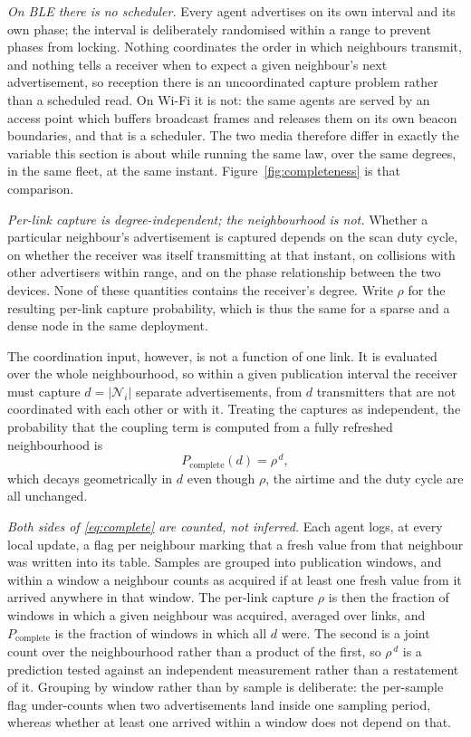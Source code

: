 \begin{enumerate}
\emph{On BLE there is no scheduler.} Every agent advertises on its own interval
and its own phase; the interval is deliberately randomised within a range to
prevent phases from locking. Nothing coordinates the order in which neighbours
transmit, and nothing tells a receiver when to expect a given neighbour's next
advertisement, so reception there is an uncoordinated capture problem rather
than a scheduled read. On Wi-Fi it is not: the same agents are served by an
access point which buffers broadcast frames and releases them on its own beacon
boundaries, and that is a scheduler. The two media therefore differ in exactly
the variable this section is about while running the same law, over the same
degrees, in the same fleet, at the same instant. Figure~\ref{fig:completeness}
is that comparison.

\emph{Per-link capture is degree-independent; the neighbourhood is not.} Whether
a particular neighbour's advertisement is captured depends on the scan duty
cycle, on whether the receiver was itself transmitting at that instant, on
collisions with other advertisers within range, and on the phase relationship
between the two devices. None of these quantities contains the receiver's degree.
Write $\rho$ for the resulting per-link capture probability, which is thus the
same for a sparse and a dense node in the same deployment.

The coordination input, however, is not a function of one link. It is evaluated
over the whole neighbourhood, so within a given publication interval the receiver
must capture $d = |\mathcal{N}_i|$ separate advertisements, from $d$ transmitters
that are not coordinated with each other or with it. Treating the captures as
independent, the probability that the coupling term is computed from a fully
refreshed neighbourhood is
\begin{equation}\label{eq:complete}
    P_\mathrm{complete}(d) = \rho^{\,d},
\end{equation}
which decays geometrically in $d$ even though $\rho$, the airtime and the duty
cycle are all unchanged.

\emph{Both sides of \eqref{eq:complete} are counted, not inferred.} Each agent
logs, at every local update, a flag per neighbour marking that a fresh value
from that neighbour was written into its table. Samples are grouped into
publication windows, and within a window a neighbour counts as acquired if at
least one fresh value from it arrived anywhere in that window. The per-link
capture $\rho$ is then the fraction of windows in which a given neighbour was
acquired, averaged over links, and $P_\mathrm{complete}$ is the fraction of
windows in which all $d$ were. The second is a joint count over the
neighbourhood rather than a product of the first, so $\rho^{\,d}$ is a
prediction tested against an independent measurement rather than a restatement
of it. Grouping by window rather than by sample is deliberate: the per-sample
flag under-counts when two advertisements land inside one sampling period,
whereas whether at least one arrived within a window does not depend on that.


\end{enumerate}
